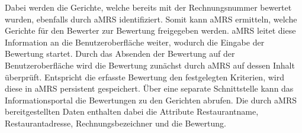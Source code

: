 Dabei werden die Gerichte, welche bereits mit der Rechnungsnummer bewertet wurden, ebenfalls durch \ac{aMRS} identifiziert.
Somit kann \ac{aMRS} ermitteln, welche Gerichte für den Bewerter zur Bewertung freigegeben werden.
\ac{aMRS} leitet diese Information an die Benutzeroberfläche weiter, wodurch die Eingabe der Bewertung startet.
\newparagraph
Durch das Absenden der Bewertung auf der Benutzeroberfläche wird die Bewertung zunächst durch \ac{aMRS} auf dessen Inhalt überprüft.
Entspricht die erfasste Bewertung den festgelegten Kriterien, wird diese in \ac{aMRS} persistent gespeichert.
\newparagraph
Über eine separate Schnittstelle kann das Informationsportal die Bewertungen zu den Gerichten abrufen.
Die durch \ac{aMRS} bereitgestellten Daten enthalten dabei die Attribute Restaurantname, Restaurantadresse, Rechnungsbezeichner und die Bewertung.
